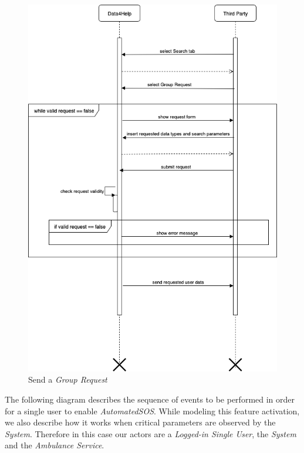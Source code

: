 \documentclass[titlepage]{article}
\begin{document}
\begin{figure}[H]
			\center
  			\includegraphics[width=\textwidth]{Diagrammi/sd4.png}
			\caption{Send a {\it Group Request}}
			\label{fig:sd4}
\end{figure}
The following diagram describes the sequence of events to be performed in order for a single user to enable {\it AutomatedSOS}. While modeling this feature activation, we also describe how it works when critical parameters are observed by the {\it System}. Therefore in this case our actors are a {\it Logged-in Single User}, the {\it System} and the {\it Ambulance Service}.
\end{document}
